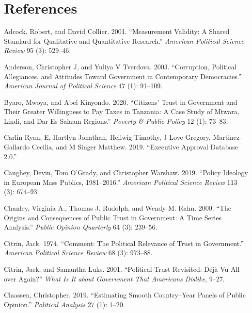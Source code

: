 \documentclass[
  12pt,
]{article}
\newlength{\cslhangindent}
\newenvironment{CSLReferences}[2] %
 {\begin{list}{}{%
  \setlength{\itemindent}{0pt}
  \setlength{\leftmargin}{0pt}
  \setlength{\parsep}{0pt}
  \ifodd #1
   \setlength{\leftmargin}{\cslhangindent}
   \setlength{\itemindent}{-1\cslhangindent}
  \fi
  \setlength{\itemsep}{#2\baselineskip}}}
 {\end{list}}
\begin{document}
\section*{References}\label{references}

\label{refs-text}
\begin{CSLReferences}{1}{0}
Adcock, Robert, and David Collier. 2001. {``Measurement Validity: A Shared Standard for Qualitative and Quantitative Research.''} \emph{American Political Science Review} 95 (3): 529--46.

Anderson, Christopher J, and Yuliya V Tverdova. 2003. {``Corruption, Political Allegiances, and Attitudes Toward Government in Contemporary Democracies.''} \emph{American Journal of Political Science} 47 (1): 91--109.

Byaro, Mwoya, and Abel Kinyondo. 2020. {``Citizens' Trust in Government and Their Greater Willingness to Pay Taxes in Tanzania: A Case Study of Mtwara, Lindi, and Dar Es Salaam Regions.''} \emph{Poverty \& Public Policy} 12 (1): 73--83.

Carlin Ryan, E, Hartlyn Jonathan, Hellwig Timothy, J Love Gregory, Martinez-Gallardo Cecilia, and M Singer Matthew. 2019. {``Executive Approval Database 2.0.''}

Caughey, Devin, Tom O'Grady, and Christopher Warshaw. 2019. {``Policy Ideology in European Mass Publics, 1981--2016.''} \emph{American Political Science Review} 113 (3): 674--93.

Chanley, Virginia A., Thomas J. Rudolph, and Wendy M. Rahn. 2000. {``The {Origins} and {Consequences} of {Public} {Trust} in {Government}: {A} {Time} {Series} {Analysis}.''} \emph{Public Opinion Quarterly} 64 (3): 239--56.

Citrin, Jack. 1974. {``Comment: The Political Relevance of Trust in Government.''} \emph{American Political Science Review} 68 (3): 973--88.

Citrin, Jack, and Samantha Luks. 2001. {``Political Trust Revisited: D{é}j{à} Vu All over Again?''} \emph{What Is It about Government That Americans Dislike}, 9--27.

Claassen, Christopher. 2019. {``Estimating Smooth Country--Year Panels of Public Opinion.''} \emph{Political Analysis} 27 (1): 1--20.


\end{CSLReferences}
\end{document}
